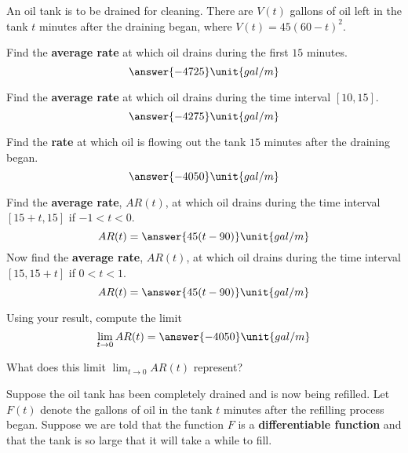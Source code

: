 \documentclass{ximera}
\begin{document}
An oil tank is to be drained for cleaning. There are $V(t)$ gallons of oil left in the tank $t$ minutes after the draining began, where $V(t)=45(60-t)^2$.
\begin{exercise}
Find the \textbf{average rate} at which oil drains during the first $15$ minutes. 
\[
\answer{-4725}\unit{gal/m}
\]
\begin{exercise}
Find the \textbf{average rate} at which oil drains during the time interval $[10,15]$. 
\[
\answer{-4275}\unit{gal/m}
\]
\begin{exercise}
Find the \textbf{rate} at which oil is flowing out the tank $15$ minutes after the draining began.
\[
\answer{-4050}\unit{gal/m}
\]
\begin{exercise}
Find the \textbf{average rate}, $AR(t)$, at which oil drains during the time interval $[15+ t,15]$ if $-1< t<0$. 
\[
AR(t)=\answer{45(t-90)}\unit{gal/m}
\]
Now find the \textbf{average rate}, $AR( t)$, at which oil drains during the time interval $[15,15+ t]$ if $0< t<1$. 
\[
AR(t)=\answer{45(t-90)}\unit{gal/m}
\]
\begin{exercise}
Using your result, compute the limit
\[
\lim_{t\to 0}AR(t)=\answer{-4050}\unit{gal/m}
\]
\begin{exercise}
What does this limit $\lim_{t\to 0}AR(t)$ represent?
\begin{multipleChoice}
\end{multipleChoice}
\begin{exercise}
Suppose the oil tank has been completely drained and is now being refilled. Let $F(t)$ denote the gallons of oil in the tank $t$ minutes after the refilling process began. Suppose we are told that the function $F$ is a \textbf{differentiable function} and that the tank is so large that it will take a while to fill. 


\end{exercise}
\end{exercise}
\end{exercise}
\end{exercise}
\end{exercise}
\end{exercise}
\end{exercise}
\end{document}
